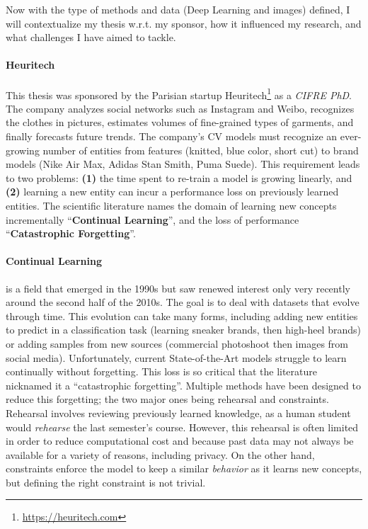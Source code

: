 Now with the type of methods and data (Deep Learning and images) defined, I will contextualize my
thesis w.r.t. my sponsor, how it influenced my research, and what challenges I have aimed to tackle.

\paragraph{Heuritech} This thesis was sponsored by the Parisian startup
Heuritech\footnote{\url{https://heuritech.com}} as a \textit{CIFRE PhD}. The company analyzes social
networks such as Instagram and Weibo, recognizes the clothes in pictures, estimates
volumes of fine-grained types of garments, and finally forecasts future trends. The company's
\acf{CV} models must recognize an ever-growing number of entities from features (\eg knitted, blue
color, short cut) to brand models (\eg Nike Air Max, Adidas Stan Smith, Puma Suede). This
requirement leads to two problems: \textbf{(1)} the time spent to re-train a model is growing
linearly, and \textbf{(2)} learning a new entity can incur a performance loss on previously learned
entities. The scientific literature names the domain of learning new concepts incrementally
``\textbf{Continual Learning}'', and the loss of performance ``\textbf{Catastrophic Forgetting}''.

\paragraph{Continual Learning} is a field that emerged in the 1990s but saw renewed interest only
very recently around the second half of the 2010s. The goal is to deal with datasets that
evolve through time. This evolution can take many forms, including adding new entities to predict in
a classification task (\eg learning sneaker brands, then high-heel brands) or adding samples from
new sources (\eg commercial photoshoot then images from social media). Unfortunately, current
State-of-the-Art models struggle to learn continually without forgetting. This loss is so critical
that the literature nicknamed it a ``catastrophic forgetting''. Multiple methods have been designed
to reduce this forgetting; the two major ones being rehearsal and constraints. Rehearsal involves
reviewing previously learned knowledge, as a human student would \textit{rehearse} the last
semester's course. However, this rehearsal is often limited in order to reduce computational cost
and because past data may not always be available for a variety of reasons, including privacy. On
the other hand, constraints enforce the model to keep a similar \textit{behavior} as it learns new
concepts, but defining the right constraint is not trivial.

